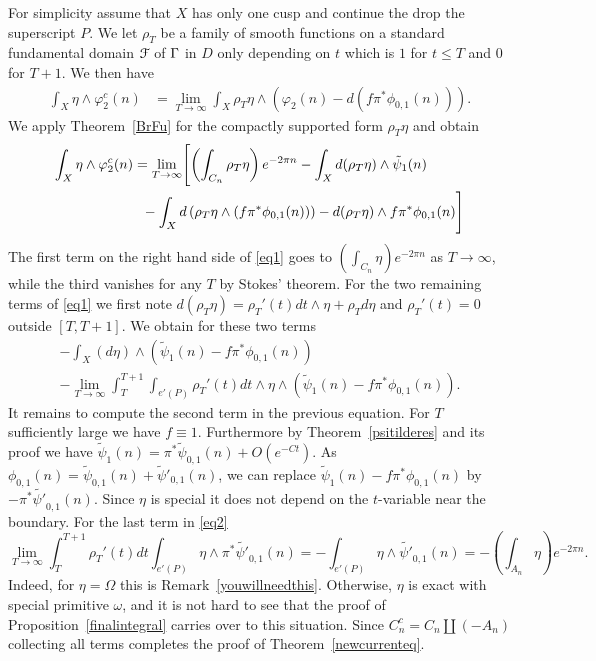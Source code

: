 For simplicity assume that $X$ has only one cusp and continue the drop the superscript $P$. We let $\rho_{T}$ be a family of smooth functions on a standard fundamental domain $\mathcal{F}$ of $\Gamma$ in $D$ only depending on $t$ which is $1$ for $t\leq T$ and $0$ for $T+1$. We then have 
\begin{align*}
\int_{X} \eta \wedge \varphi^c_{2}(n)  &= \lim_{T\to \infty} \int_{X} \rho_T \eta \wedge
\left(\varphi_2(n) -  d(f \pi^{\ast} \phi_{0,1}(n)) \right). 
\end{align*}
We apply Theorem~\ref{BrFu} for the compactly supported form $\rho_T\eta$ and obtain
\begin{align}\label{eq1}
\int_{X} \eta \wedge \varphi^c_{2}(n&)=  \lim_{T\to \infty} \Biggl[ \left(\int_{C_n}  \rho_T \eta \right) e^{- 2\pi n} - \int_{X}  d (\rho_T \eta) \wedge \tilde{\psi}_1(n) \\
& \quad - \int_X  d\left( \rho_T \eta \wedge (f \pi^{\ast} \phi_{0,1}(n)) \right) - d(\rho_T \eta) \wedge f \pi^{\ast} \phi_{0,1}(n) \Biggr] \notag
\end{align}
The first term on the right hand side of \eqref{eq1} goes to $\left(\int_{C_n} \eta\right)e^{-2\pi n}$ as $T \to \infty$, while the third vanishes for any $T$ by Stokes' theorem. For the two remaining terms of \eqref{eq1} we first note $d(\rho_T \eta) = \rho_T'(t) dt \wedge \eta + \rho_T d\eta$ and  $\rho_T'(t)=0$ outside $[T,T+1]$. We obtain for these two terms
\begin{multline}\label{eq2}
-  \int_{X}  (d \eta) \wedge \left( \tilde{\psi}_1(n) - f \pi^{\ast} \phi_{0,1}(n) \right) \\ - \lim_{T\to \infty} \int_T^{T+1} \int_{e'(P)} \rho_T'(t)dt \wedge \eta \wedge \left( \tilde{\psi}_1(n) - f  \pi^{\ast}\phi_{0,1}(n)\right). 
\end{multline}
It remains to compute the second term in the previous equation. For $T$ sufficiently large we have $f \equiv 1$. Furthermore by Theorem~\ref{psitilderes} and its proof we have $\tilde{\psi}_1(n) = \pi^{\ast} \tilde{\psi}_{0,1}(n) + O(e^{-Ct})$. As
$\phi_{0,1}(n) = \tilde{\psi}_{0,1}(n)+\tilde{\psi}'_{0,1}(n)$, we can replace  
$\tilde{\psi}_1(n) - f  \pi^{\ast}\phi_{0,1}(n)$ by $-\pi^{\ast} \tilde{\psi'}_{0,1}(n)$. Since $\eta$ is special it does not depend on the $t$-variable near the boundary. For the last term in \eqref{eq2}
\[
 \lim_{T\to \infty} \int_T^{T+1}  \rho_T'(t)dt \int_{e'(P)} \eta \wedge \pi^{\ast} \tilde{\psi'}_{0,1}(n) = -  \int_{e'(P)} \eta \wedge \tilde{\psi'}_{0,1}(n) = -
\left(\int_{A_n} \eta \right) e^{-2\pi n}.
\]
Indeed, for $\eta = \Omega$ this is Remark~\ref{youwillneedthis}. Otherwise, $\eta$ is exact with special primitive $\omega$, and it is not hard to see that the proof of Proposition~\ref{finalintegral} carries over to this situation. Since $C_n^c = C_n \coprod (-A_n)$ collecting all terms completes the proof of Theorem~\ref{newcurrenteq}. 









